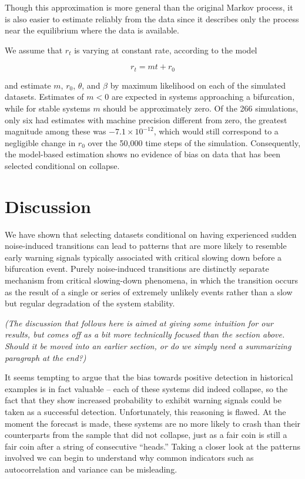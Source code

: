 \documentclass[authoryear,review,12pt]{elsarticle}
\newcommand{\cb}[1]{{\it \color{darkgreen} (#1)}}
\begin{document}
Though this approximation is more general than the original Markov process,
it is also easier to estimate reliably from the data since it describes only 
the process near the equilibrium where the data is available.  

We assume that $r_t$ is varying at constant rate, according to the model

\begin{equation}
 r_t = m t + r_0 
\end{equation}

and estimate $m$, $r_0$, $\theta$, and $\beta$ by maximum likelihood on each
of the simulated datasets.  Estimates of $m < 0 $ are expected in systems 
approaching a bifurcation, while for stable systems $m$ should be approximately zero.
Of the 266 simulations, only six had estimates with machine precision different
from zero, the greatest magnitude among these was $-7.1 \times 10^{-12}$,
which would still correspond to a negligible change in $r_0$ over the 50,000 time steps
of the simulation.  Consequently, the model-based estimation shows no 
evidence of bias on data that has been selected conditional on collapse.   

 \section{Discussion}

We have shown that selecting datasets conditional on having experienced sudden 
noise-induced transitions can lead to patterns that are more likely to resemble
early warning signals typically associated with critical slowing down before 
a bifurcation event.  Purely noise-induced transitions are distinctly separate 
mechanism from critical slowing-down phenomena, in which the transition occurs
as the result of a single or series of extremely unlikely events rather than
a slow but regular degradation of the system stability.  

\cb{The discussion that follows here is aimed at giving some intuition for our results, but comes off as a bit more technically focused than the section above.  Should it be moved into an earlier section, or do we simply need a summarizing paragraph at the end?}

It seems tempting to argue that the bias towards positive detection in historical
examples is in fact valuable -- each of these systems did indeed collapse, so the fact that they show increased 
probability to exhibit warning signals could be taken as a successful detection.
Unfortunately, this reasoning is flawed. At the moment the forecast is made,
these systems are no more likely to crash than their counterparts from the sample
that did not collapse, just as a fair coin is still a fair coin after a string of
consecutive ``heads.''  Taking a closer look at the patterns involved we can
begin to understand why common indicators such as autocorrelation and variance
can be misleading.
\end{document}
